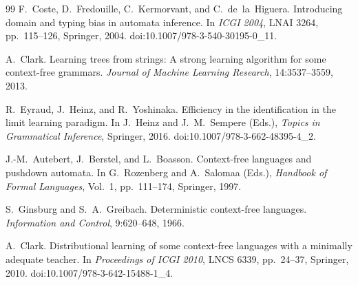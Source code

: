 \documentclass[11pt,a4paper]{ltjsarticle}
\theoremstyle{remark}
\theoremstyle{plain}
\begin{document}
\begin{thebibliography}{99}
F.~Coste, D.~Fredouille, C.~Kermorvant, and C.~de~la~Higuera.
\newblock Introducing domain and typing bias in automata inference.
\newblock In \textit{ICGI 2004}, LNAI 3264, pp.~115--126, Springer, 2004.
doi:10.1007/978-3-540-30195-0\_11.

A.~Clark.
\newblock Learning trees from strings: A strong learning algorithm for some context-free grammars.
\newblock \textit{Journal of Machine Learning Research}, 14:3537--3559, 2013.




R.~Eyraud, J.~Heinz, and R.~Yoshinaka.
\newblock Efficiency in the identification in the limit learning paradigm.
\newblock In J.~Heinz and J.~M.~Sempere (Eds.),
\emph{Topics in Grammatical Inference}, Springer, 2016.
doi:10.1007/978-3-662-48395-4\_2.

J.-M.~Autebert, J.~Berstel, and L.~Boasson.
\newblock Context-free languages and pushdown automata.
\newblock In G.~Rozenberg and A.~Salomaa (Eds.),
\emph{Handbook of Formal Languages}, Vol.~1, pp.~111--174,
Springer, 1997.

S.~Ginsburg and S.~A.~Greibach.
\newblock Deterministic context-free languages.
\newblock \emph{Information and Control}, 9:620--648, 1966.

A.~Clark.
\newblock Distributional learning of some context-free languages with a
minimally adequate teacher.
\newblock In \emph{Proceedings of ICGI 2010}, LNCS 6339, pp.~24--37,
Springer, 2010.
doi:10.1007/978-3-642-15488-1\_4.



\end{thebibliography}
\end{document}
